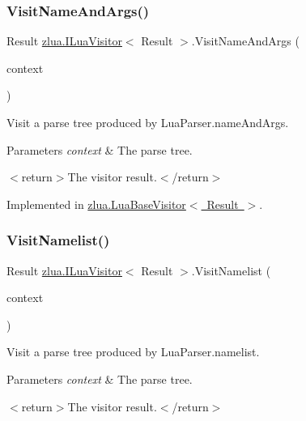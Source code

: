 \subsubsection{\texorpdfstring{Visit\+Name\+And\+Args()}{VisitNameAndArgs()}}
{\footnotesize\ttfamily Result \mbox{\hyperlink{interfacezlua_1_1_i_lua_visitor}{zlua.\+I\+Lua\+Visitor}}$<$ Result $>$.Visit\+Name\+And\+Args (\begin{DoxyParamCaption}\item[{\mbox{[}\+Not\+Null\mbox{]} \mbox{\hyperlink{classzlua_1_1_lua_parser_1_1_name_and_args_context}{Lua\+Parser.\+Name\+And\+Args\+Context}}}]{context }\end{DoxyParamCaption})}



Visit a parse tree produced by Lua\+Parser.\+name\+And\+Args. 


\begin{DoxyParams}{Parameters}
{\em context} & The parse tree.\\
\hline
\end{DoxyParams}
$<$return$>$The visitor result.$<$/return$>$ 

Implemented in \mbox{\hyperlink{classzlua_1_1_lua_base_visitor_a461a0315ce3a25873432dd1e9153bcc6}{zlua.\+Lua\+Base\+Visitor$<$ Result $>$}}.

\mbox{\label{interfacezlua_1_1_i_lua_visitor_a6e378a829595016d1d812a7d0b7c9048}} 
\subsubsection{\texorpdfstring{Visit\+Namelist()}{VisitNamelist()}}
{\footnotesize\ttfamily Result \mbox{\hyperlink{interfacezlua_1_1_i_lua_visitor}{zlua.\+I\+Lua\+Visitor}}$<$ Result $>$.Visit\+Namelist (\begin{DoxyParamCaption}\item[{\mbox{[}\+Not\+Null\mbox{]} \mbox{\hyperlink{classzlua_1_1_lua_parser_1_1_namelist_context}{Lua\+Parser.\+Namelist\+Context}}}]{context }\end{DoxyParamCaption})}



Visit a parse tree produced by Lua\+Parser.\+namelist. 


\begin{DoxyParams}{Parameters}
{\em context} & The parse tree.\\
\hline
\end{DoxyParams}
$<$return$>$The visitor result.$<$/return$>$ 

